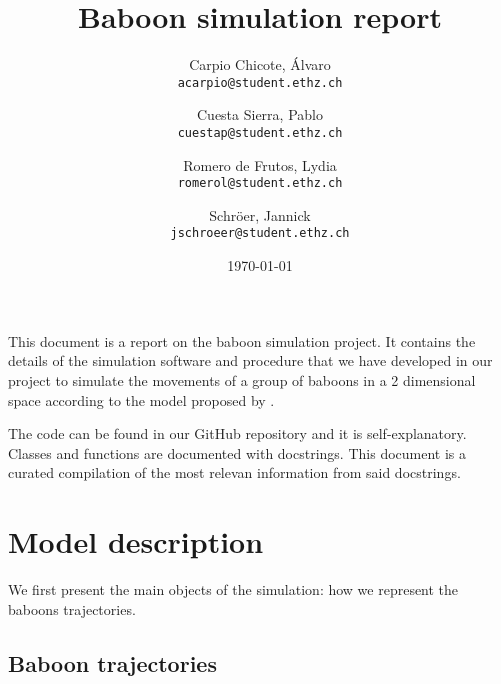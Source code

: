 \documentclass[
    article,
    oneside,
]{memoir}
\begin{document}
\title{Baboon simulation report}
\author{
    Carpio Chicote, Álvaro \\ \texttt{acarpio@student.ethz.ch}
    \and
    Cuesta Sierra, Pablo \\ \texttt{cuestap@student.ethz.ch}
    \and 
    Romero de Frutos, Lydia \\ \texttt{romerol@student.ethz.ch}
    \and Schröer, Jannick \\ \texttt{jschroeer@student.ethz.ch}
}
\date{\today}
\maketitle

This document is a report on the baboon simulation project. It contains the details of the simulation software and procedure that we have developed in our project to simulate the movements of a group of baboons in a 2 dimensional space according to the model proposed by \cite{StrandburgPeshkin2015}.

The code can be found in our GitHub repository \cite{github:baboon-simulation} and it is self-explanatory. Classes and functions are documented with docstrings. This document is a curated compilation of the most relevan information from said docstrings. 

\chapter{Model description}


We first present the main objects of the simulation: how we represent the baboons trajectories.

\section{Baboon trajectories}
\end{document}
